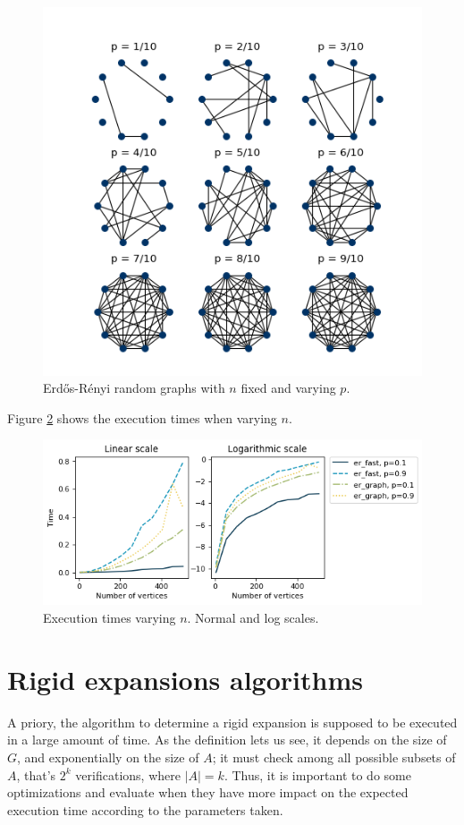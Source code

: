 \begin{figure}[h]
	\centering
	\includegraphics[scale=0.85]{Figures/ER-10.png}
	\caption{Erdős-Rényi random graphs with $n$ fixed and varying $p$.}
	\label{fig:ErdosRenyi10}
\end{figure}

Figure \ref{fig:tiemposER} shows the execution times when varying $n$.
\begin{figure}[h!]
	\centering
	\includegraphics[scale=0.7]{Python/Figures/Time-execution-er-generation-algoriths.png}
	\caption{Execution times varying $n$. Normal and log scales.}
	\label{fig:tiemposER}
\end{figure}

\section{Rigid expansions algorithms}
A priory, the algorithm to determine a rigid expansion is supposed to be executed in a large amount of time. As the definition lets us see, it depends on the size of $G$, and exponentially on the size of $A$; it must check among all possible subsets of $A$, that's $2^{k}$ verifications, where $|A|=k$. Thus, it is important to do some optimizations and evaluate when they have more impact on the expected execution time according to the parameters taken.

